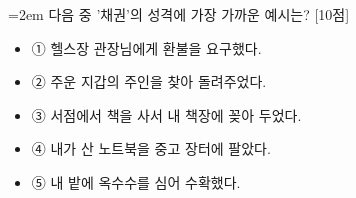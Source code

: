 \documentclass[11pt,a4paper]{article}
\newcommand{\qnum}[1]{%
  \tikz[baseline=(num.base)]{%
    \node[circle, fill=numCircle, text=white, inner sep=0pt,
          minimum size=18pt, font=\small\bfseries] (num) {#1};%
  }%
}
\newcommand{\pts}[1]{%
  \hfill\textcolor{ptsBadge}{[#1점]}%
}
\begin{document}
\vspace{4mm}
\begin{minipage}{\columnwidth}
{\hangindent=2em
\qnum{32}\enspace 다음 중 '채권'의 성격에 가장 가까운 예시는? \pts{10}
\par}

\vspace{3mm}
\begin{itemize}[leftmargin=2.5em, labelsep=0.3em, label={}, itemsep=4pt, parsep=1pt, topsep=0pt]
  \item ① 헬스장 관장님에게 환불을 요구했다.
  \item ② 주운 지갑의 주인을 찾아 돌려주었다.
  \item ③ 서점에서 책을 사서 내 책장에 꽂아 두었다.
  \item ④ 내가 산 노트북을 중고 장터에 팔았다.
  \item ⑤ 내 밭에 옥수수를 심어 수확했다.
\end{itemize}
\end{minipage}
\vspace{4mm}
\end{document}
